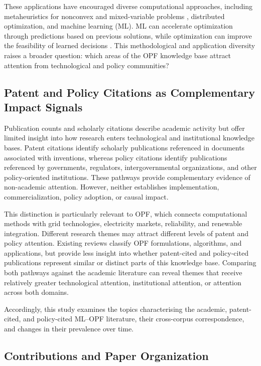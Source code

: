 \documentclass[a4paper,fleqn]{cas-sc}
\begin{document}
    These applications have encouraged diverse computational approaches, including metaheuristics for nonconvex and mixed-variable problems \cite{papadimitrakis2021metaheuristic}, distributed optimization, and machine learning (ML). ML can accelerate optimization through predictions based on previous solutions, while optimization can improve the feasibility of learned decisions \cite{steven2026machine}. This methodological and application diversity raises a broader question: which areas of the OPF knowledge base attract attention from technological and policy communities?
    
    \subsection{Patent and Policy Citations as Complementary Impact Signals}
    
    Publication counts and scholarly citations describe academic activity but offer limited insight into how research enters technological and institutional knowledge bases. Patent citations identify scholarly publications referenced in documents associated with inventions, whereas policy citations identify publications referenced by governments, regulators, intergovernmental organizations, and other policy-oriented institutions. These pathways provide complementary evidence of non-academic attention. However, neither establishes implementation, commercialization, policy adoption, or causal impact.
    
    This distinction is particularly relevant to OPF, which connects computational methods with grid technologies, electricity markets, reliability, and renewable integration. Different research themes may attract different levels of patent and policy attention. Existing reviews classify OPF formulations, algorithms, and applications, but provide less insight into whether patent-cited and policy-cited publications represent similar or distinct parts of this knowledge base. Comparing both pathways against the academic literature can reveal themes that receive relatively greater technological attention, institutional attention, or attention across both domains.
    
    Accordingly, this study examines the topics characterising the academic, patent-cited, and policy-cited ML--OPF literature, their cross-corpus correspondence, and changes in their prevalence over time.
    
    \subsection{Contributions and Paper Organization}
    \label{sec:contributions_outline}
    
\end{document}
